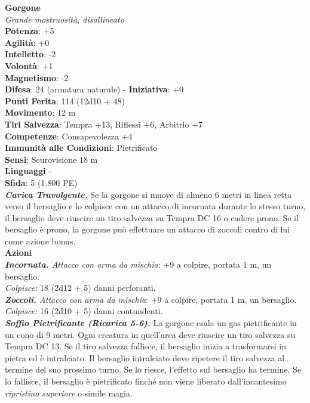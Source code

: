\begin{multicols}{2}
\medskip\textbf{Gorgone}\\
\emph{Grande mostruosità, disallineato}\\
\textbf{Potenza}: +5\\
\textbf{Agilità}: +0\\
\textbf{Intelletto}: -2\\
\textbf{Volontà}: +1\\
\textbf{Magnetismo}: -2\\
\textbf{Difesa}: 24 (armatura naturale) - \textbf{Iniziativa}: +0\\
\textbf{Punti Ferita}: 114 (12d10 + 48)\\
\textbf{Movimento}: 12 m\\
\textbf{Tiri Salvezza}: Tempra +13, Riflessi +6, Arbitrio +7\\
\textbf{Competenze}: Consapevolezza +4\\
\textbf{Immunità alle Condizioni}: Pietrificato\\
\textbf{Sensi}: Scurovisione 18 m\\
\textbf{Linguaggi} -\\
\textbf{Sfida}: 5 (1.800 PE)\smallskip\\
\emph{\textbf{Carica Travolgente.}} Se la gorgone si muove di almeno 6 metri in linea retta verso il bersaglio e lo colpisce con un attacco di incornata durante lo stesso turno, il bersaglio deve riuscire un tiro salvezza su Tempra DC 16 o cadere prono. Se il bersaglio è prono, la gorgone può effettuare un attacco di zoccoli contro di lui come azione bonus.\\
\smallskip\textbf{Azioni}\\
\emph{\textbf{Incornata.} Attacco con arma da mischia}: +9 a colpire, portata 1 m, un bersaglio.\\
\emph{Colpisce:} 18 (2d12 + 5) danni perforanti.\\
\emph{\textbf{Zoccoli.} Attacco con arma da mischia}: +9 a colpire, portata 1 m, un bersaglio.\\
\emph{Colpisce:} 16 (2d10 + 5) danni contundenti.\\
\emph{\textbf{Soffio Pietrificante (Ricarica 5-6).}} La gorgone esala un gas pietrificante in un cono di 9 metri. Ogni creatura in quell'area deve riuscire un tiro salvezza su Tempra DC 13. Se il tiro salvezza fallisce, il bersaglio inizia a trasformarsi in pietra ed è intralciato. Il bersaglio intralciato deve ripetere il tiro salvezza al termine del suo prossimo turno. Se lo riesce, l'effetto sul bersaglio ha termine. Se lo fallisce, il bersaglio è pietrificato finché non viene liberato dall'incantesimo \emph{ripristino superiore} o simile magia.\\

\end{multicols}
